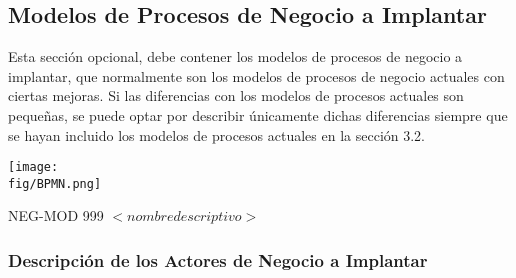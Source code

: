 \subsection{Modelos de Procesos de Negocio a Implantar} 

\begin{textoazul}
Esta sección opcional, debe contener los modelos de procesos de negocio a implantar, que normalmente son los modelos de procesos de negocio actuales con ciertas mejoras. Si las diferencias con los modelos de procesos actuales son pequeñas, se puede optar por describir únicamente dichas diferencias siempre que se hayan incluido los modelos de procesos actuales en la sección 3.2.
\end{textoazul}
 
 
 
 \begin{Artefacto}[H]
 \centering
\texttt{[image: \\fig/BPMN.png]}
 \caption{NEG-MOD 999	$<nombre descriptivo>$}
 \end{Artefacto}
 
\subsubsection{Descripción de los Actores de Negocio a Implantar}

